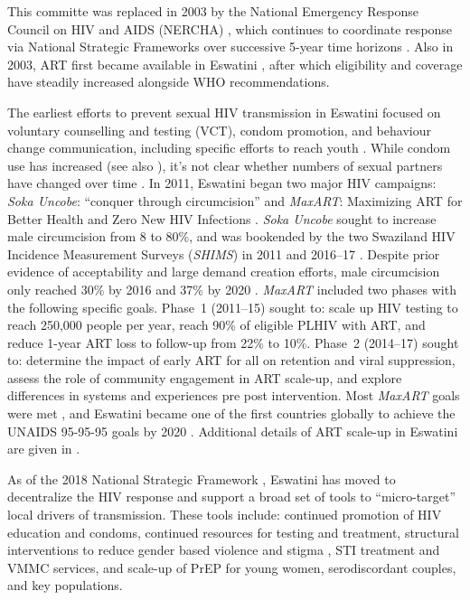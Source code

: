 This committe was replaced in 2003 by
the National Emergency Response Council on HIV and AIDS (NERCHA) \cite{Mabuza2017},
which continues to coordinate response via National Strategic Frameworks
over successive 5-year time horizons \cite{NERCHA2009,NERCHA2014,NERCHA2018}.
Also in 2003, ART first became available in Eswatini \cite{NERCHA2012},
after which eligibility and coverage have steadily increased alongside WHO recommendations.
\par
The earliest efforts to prevent sexual HIV transmission in Eswatini focused on
voluntary counselling and testing (VCT), condom promotion, and behaviour change communication,
including specific efforts to reach youth \cite{NERCHA2007}.
While condom use has increased (see also ),
it's not clear whether numbers of sexual partners have changed over time \cite{Cockcroft2010}.
In 2011, Eswatini began two major HIV campaigns:
\emph{Soka Uncobe}: ``conquer through circumcision'' \cite{SHIMS1} and
\emph{MaxART}: Maximizing ART for Better Health and Zero New HIV Infections \cite{MaxART1,MaxART2}.
\emph{Soka Uncobe} sought to increase male circumcision from 8 to 80\%,
and was bookended by the two Swaziland HIV Incidence Measurement Surveys (\emph{SHIMS})
in 2011 \cite{SHIMS1} and 2016--17 \cite{SHIMS2}.
Despite prior evidence of acceptability and large demand creation efforts,
male circumcision only reached 30\% by 2016 \cite{SHIMS2} and 37\% by 2020 \cite{EswCOP21}.
\emph{MaxART} included two phases with the following specific goals.
Phase~1 (2011--15) sought to:
scale up HIV testing to reach 250,000 people per year,
reach 90\% of eligible PLHIV with ART, and
reduce 1-year ART loss to follow-up from 22\% to 10\%.
Phase~2 (2014--17) sought to:
determine the impact of early ART for all on retention and viral suppression,
assess the role of community engagement in ART scale-up, and
explore differences in systems and experiences pre \vs post intervention.
Most \emph{MaxART} goals were met \cite{MaxART2,Walsh2020},
and Eswatini became one of the first countries globally to
achieve the UNAIDS 95-95-95 goals by 2020 \cite{959595,AIDSinfo}.
Additional details of ART scale-up in Eswatini are given in .
\par
As of the 2018 National Strategic Framework \cite{NERCHA2018},
Eswatini has moved to decentralize the HIV response
and support a broad set of tools to ``micro-target'' local drivers of transmission.
These tools include:
continued promotion of HIV education and condoms,
continued resources for testing and treatment,
structural interventions to reduce gender based violence and stigma \cite{Saul2018},
STI treatment and VMMC services, and
scale-up of PrEP for young women, serodiscordant couples, and key populations.
